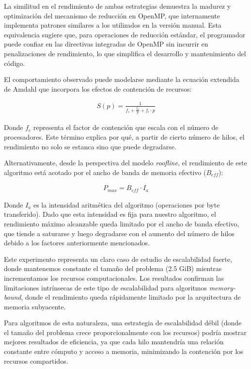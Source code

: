         La similitud en el rendimiento de ambas estrategias demuestra la madurez y optimización del mecanismo de reducción en OpenMP, que internamente implementa patrones similares a los utilizados en la versión manual. Esta equivalencia sugiere que, para operaciones de reducción estándar, el programador puede confiar en las directivas integradas de OpenMP sin incurrir en penalizaciones de rendimiento, lo que simplifica el desarrollo y mantenimiento del código.
        
        El comportamiento observado puede modelarse mediante la ecuación extendida de Amdahl que incorpora los efectos de contención de recursos:

        \begin{align}
            S(p) = \frac{1}{f_s + \frac{f_p}{p} + f_c \cdot p}
        \end{align}
        
        Donde $f_c$ representa el factor de contención que escala con el número de procesadores. Este término explica por qué, a partir de cierto número de hilos, el rendimiento no solo se estanca sino que puede degradarse. 
        
        Alternativamente, desde la perspectiva del modelo \textit{roofline}, el rendimiento de este algoritmo está acotado por el ancho de banda de memoria efectivo ($B_{eff}$):

        \begin{align}
            P_{max} = B_{eff} \cdot I_{a}
        \end{align}
        
        Donde $I_{a}$ es la intensidad aritmética del algoritmo (operaciones por byte transferido). Dado que esta intensidad es fija para nuestro algoritmo, el rendimiento máximo alcanzable queda limitado por el ancho de banda efectivo, que tiende a saturarse y luego degradarse con el aumento del número de hilos debido a los factores anteriormente mencionados.
        
        Este experimento representa un claro caso de estudio de escalabilidad fuerte, donde mantenemos constante el tamaño del problema (2.5 GiB) mientras incrementamos los recursos computacionales. Los resultados confirman las limitaciones intrínsecas de este tipo de escalabilidad para algoritmos \textit{memory-bound}, donde el rendimiento queda rápidamente limitado por la arquitectura de memoria subyacente.
        
        Para algoritmos de esta naturaleza, una estrategia de escalabilidad débil (donde el tamaño del problema crece proporcionalmente con los recursos) podría mostrar mejores resultados de eficiencia, ya que cada hilo mantendría una relación constante entre cómputo y acceso a memoria, minimizando la contención por los recursos compartidos.

